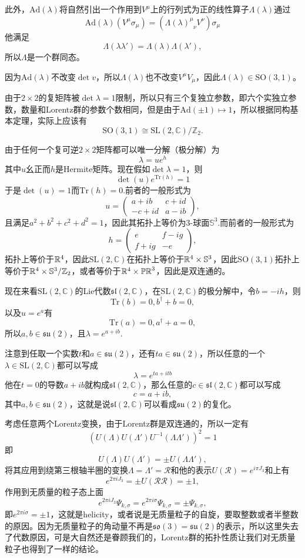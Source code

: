 \documentclass[9pt]{extbook}
\begin{document}
此外，$\mathrm{Ad}(\lambda)$将自然引出一个作用到$V^\mu$上的行列式为正的线性算子$\Lambda(\lambda)$通过
\[\mathrm{Ad}(\lambda)(V^\mu\sigma_\mu)=(\Lambda(\lambda)^\mu_{\phantom{\mu}\nu}V^\nu)\sigma_\mu\]
他满足
\[
\Lambda(\lambda\lambda')=\Lambda(\lambda)\Lambda(\lambda'),
\]
所以$\Lambda$是一个群同态。

因为$\mathrm{Ad}(\lambda)$不改变$\det v$，所以$\Lambda(\lambda)$也不改变$V^\mu V_\mu$，因此$\Lambda(\lambda)\in \mathrm{SO}(3,1)$。

由于$2\times 2$的复矩阵被$\det \lambda=1$限制，所以只有三个复独立参数，即六个实独立参数，数量和Lorentz群的参数个数相同，但是由于$\mathrm{Ad}(\pm 1)\mapsto 1$，所以根据同构基本定理，实际上应该有
\[
\mathrm{SO}(3,1)\cong \mathrm{SL}(2,\mathbb{C})/\mathbb{Z}_2.
\]

由于任何一个复可逆$2\times 2$矩阵都可以唯一分解（极分解）为
\[
\lambda=ue^{h}
\]
其中$u$幺正而$h$是Hermite矩阵。现在假如$\det \lambda=1$，则
\[
\det(u)e^{\mathrm{Tr}(h)}=1
\]
于是$\det(u)=1$而$\mathrm{Tr}(h)=0$.前者的一般形式为
\[
u=
\begin{pmatrix}
a+ib&c+id\\
-c+id&a-ib
\end{pmatrix},
\]
且满足$a^2+b^2+c^2+d^2=1$，因此其拓扑上等价为3-球面$\mathbb{S}^3$.而前者的一般形式为
\[
h=\begin{pmatrix}
e&f-ig\\
f+ig&-e
\end{pmatrix},
\]
拓扑上等价于$\mathbb{R}^4$，因此$\mathrm{SL}(2,\mathbb{C})$在拓扑上等价于$\mathbb{R}^4\times \mathbb{S}^3$，因此$\mathrm{SO}(3,1)$拓扑上等价于$\mathbb{R}^4\times \mathbb{S}^3/\mathbb{Z}_2$，或者等价于$\mathbb{R}^4\times \mathbb{PR}^3$，因此是双连通的。

现在来看$\mathrm{SL}(2,\mathbb{C})$的Lie代数$\mathfrak{sl}(2,\mathbb{C})$，在$\mathrm{SL}(2,\mathbb{C})$的极分解中，令$b=-ih$，则
\[
\mathrm{Tr}(b)=0,b^\dag+b=0,
\]
以及$u=e^a$有
\[
\mathrm{Tr}(a)=0,a^\dag+a=0,
\]
所以$a,b\in\mathfrak{su}(2)$，且$\lambda=e^{a+ib}$.

注意到任取一个实数$t$和$a\in\mathfrak{su}(2)$，还有$ta \in\mathfrak{su}(2)$，所以任意的一个$\lambda \in \mathrm{SL}(2,\mathbb{C})$都可以写成
\[
\lambda=e^{ta+itb}
\]
他在$t=0$的导数$a+ib$就构成$\mathfrak{sl}(2,\mathbb{C})$，那么任意的$c\in \mathfrak{sl}(2,\mathbb{C})$都可以写成
\[
c=a+ib,
\]
其中$a,b\in\mathfrak{su}(2)$，这就是说$\mathfrak{sl}(2,\mathbb{C})$可以看成$\mathfrak{su}(2)$的复化。

考虑任意两个Lorentz变换，由于Lorentz群是双连通的，所以一定有
\[
\left(U(\Lambda)U(\Lambda')U^{-1}(\Lambda\Lambda')\right)^2=1
\]
即
\[
U(\Lambda)U(\Lambda')=\pm U(\Lambda\Lambda'),
\]
将其应用到绕第三根轴半圈的变换$\Lambda=\Lambda'=\mathscr{R}$和他的表示$U(\mathscr{R})=e^{i\pi J_3}$和上有
\[
e^{2\pi iJ_3}=\pm U(\mathscr{R}\mathscr{R})=\pm 1,
\]
作用到无质量的粒子态上面
\[
e^{2\pi iJ_3}\Psi_{k,\sigma}=e^{2\pi i\sigma}\Psi_{k,\sigma}=\pm \Psi_{k,\sigma},
\]
即$e^{2\pi i\sigma}=\pm 1$，这就是helicity，或者说是无质量粒子的自旋，要取整数或者半整数的原因。因为无质量粒子的角动量不再是$\mathfrak{so}(3)=\mathfrak{su}(2)$的表示，所以这里失去了代数原因，可是大自然还是眷顾我们的，Lorentz群的拓扑性质让我们对无质量粒子也得到了一样的结论。
\end{document}
